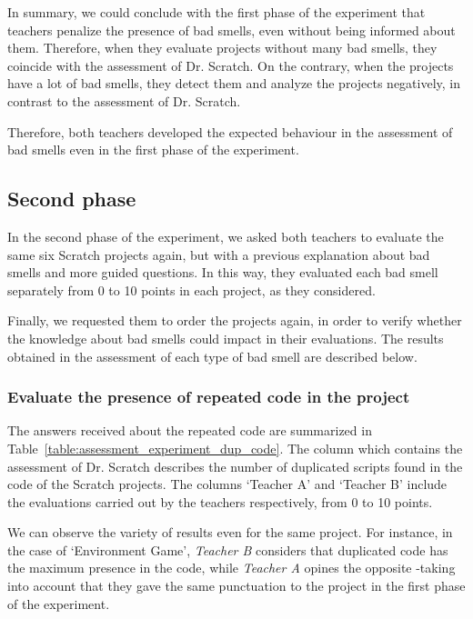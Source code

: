 \hfill

In summary, we could conclude with the first phase of the experiment that teachers penalize the presence of bad smells, even without being informed about them. Therefore, when they evaluate projects without many bad smells, they coincide with the assessment of Dr. Scratch. On the contrary, when the projects have a lot of bad smells, they detect them and analyze the projects negatively, in contrast to the assessment of Dr. Scratch. 

Therefore, both teachers developed the expected behaviour in the assessment of bad smells even in the first phase of the experiment.


\subsection{Second phase}
\label{subsec:second_phase_experiment}

In the second phase of the experiment, we asked both teachers to evaluate the same six Scratch projects again, but with a previous explanation about bad smells and more guided questions. In this way, they evaluated each bad smell separately from 0 to 10 points in each project, as they considered.

Finally, we requested them to order the projects again, in order to verify whether the knowledge about bad smells could impact in their evaluations. The results obtained in the assessment of each type of bad smell are described below.


\subsubsection{Evaluate the presence of repeated code in the project}
\label{subsubsec:duplicated_code_experiment}

The answers received about the repeated code are summarized in Table~\ref{table:assessment_experiment_dup_code}. The column which contains the assessment of Dr. Scratch describes the number of duplicated scripts found in the code of the Scratch projects. The columns `Teacher A' and `Teacher B' include the evaluations carried out by the teachers respectively, from 0 to 10 points.

We can observe the variety of results even for the same project. For instance, in the case of `Environment Game', \textit{Teacher B} considers that duplicated code has the maximum presence in the code, while \textit{Teacher A} opines the opposite -taking into account that they gave the same punctuation to the project in the first phase of the experiment.

